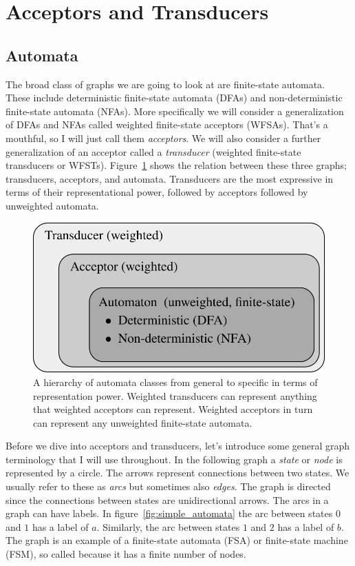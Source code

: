 \section{Acceptors and Transducers}
\label{sec:acceptors_transducers}

\subsection{Automata}
\label{sec:automata}

The broad class of graphs we are going to look at are finite-state automata.
These include deterministic finite-state automata (DFAs) and non-deterministic
finite-state automata (NFAs). More specifically we will consider a
generalization of DFAs and NFAs called weighted finite-state acceptors (WFSAs).
That's a mouthful, so I will just call them \emph{acceptors}. We will also
consider a further generalization of an acceptor called a \emph{transducer}
(weighted finite-state transducers or WFSTs). Figure~\ref{fig:wfsa_classes}
shows the relation between these three graphs; transducers, acceptors, and
automata. Transducers are the most expressive in terms of their
representational power, followed by acceptors followed by unweighted automata.

\begin{figure}
    \centering
    \includegraphics[width=0.7\linewidth]{figures/wfsa_classes}
    \caption{A hierarchy of automata classes from general to specific in terms
    of representation power. Weighted transducers can represent anything that
    weighted acceptors can represent. Weighted acceptors in turn can represent
    any unweighted finite-state automata.}
    \label{fig:wfsa_classes}
\end{figure}

Before we dive into acceptors and transducers, let's introduce some general
graph terminology that I will use throughout. In the following graph a
\emph{state} or \emph{node} is represented by a circle. The arrows represent
connections between two states. We usually refer to these as \emph{arcs} but
sometimes also \emph{edges}. The graph is directed since the connections
between states are unidirectional arrows. The arcs in a graph can have labels.
In figure~\ref{fig:simple_automata} the arc between states $0$ and $1$ has a
label of $a$. Similarly, the arc between states $1$ and $2$ has a label of $b$.
The graph is an example of a finite-state automata (FSA) or finite-state
machine (FSM), so called because it has a finite number of nodes.

